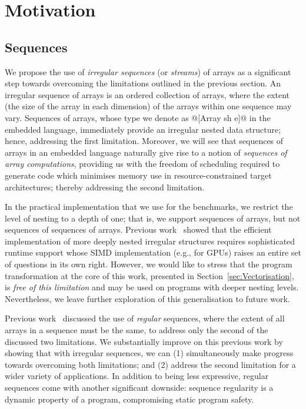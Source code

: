 \chapter{Motivation}

\section{Sequences}
\label{sec:sequences}

We propose the use of \emph{irregular sequences} (or \emph{streams}) of arrays as a significant step towards overcoming the limitations outlined in the previous section. An irregular sequence of arrays is an ordered collection of arrays, where the extent (the size of the array in each dimension) of the arrays within one sequence may vary. Sequences of arrays, whose type we denote as @[Array sh e]@ in the embedded language, immediately provide an irregular nested data structure; hence, addressing the first limitation. Moreover, we will see that sequences of arrays in an embedded language naturally give rise to a notion of \emph{sequences of array computations}, providing us with the freedom of scheduling required to generate code which minimises memory use in resource-constrained target architectures; thereby addressing the second limitation.

In the practical implementation that we use for the benchmarks, we restrict the level of nesting to a depth of one; that is, we support sequences of arrays, but not sequences of sequences of arrays. Previous work~\citep{Lippmeier:replicate} showed that the efficient implementation of more deeply nested irregular structures requires sophisticated runtime support whose SIMD implementation (e.g., for GPUs) raises an entire set of questions in its own right. However, we would like to stress that the program transformation at the core of this work, presented in Section~\ref{sec:Vectorisation}, is \emph{free of this limitation} and may be used on programs with deeper nesting levels. Nevertheless, we leave further exploration of this generalisation to future work.

Previous work~\citep{Madsen:2015} discussed the use of \emph{regular} sequences, where the extent of all arrays in a sequence must be the same, to address only the second of the discussed two limitations. We substantially improve on this previous work by showing that with irregular sequences, we can (1) simultaneously make progress towards overcoming both limitations; and (2) address the second limitation for a wider variety of applications. In addition to being less expressive, regular sequences come with another significant downside: sequence regularity is a dynamic property of a program, compromising static program safety.

